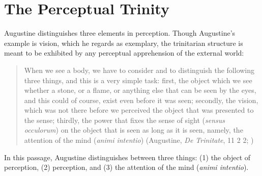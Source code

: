 \documentclass[12pt]{article}
\begin{document}
\section{The Perceptual Trinity} %
\label{sec:the_perceptual_trinity}

Augustine distinguishes three elements in perception. Though Augustine's example is vision, which he regards as exemplary, the trinitarian structure is meant to be exhibited by any perceptual apprehension of the external world:
\begin{quote}
	When we see a body, we have to consider and to distinguish the following three things, and this is a very simple task: first, the object which we see whether a stone, or a flame, or anything else that can be seen by the eyes, and this could of course, exist even before it was seen; secondly, the vision, which was not there before we perceived the object that was presented to the sense; thirdly, the power that fixes the sense of sight (\emph{sensus occulorum}) on the object that is seen as long as it is seen, namely, the attention of the mind (\emph{animi intentio}) (Augustine, \emph{De Trinitate}, 11 2 2; \citealt[61--62]{Matthews:2002ly})
\end{quote}
In this passage, Augustine distinguishes between three things: (1) the object of perception, (2) perception, and (3) the attention of the mind (\emph{animi intentio}).
\end{document}
